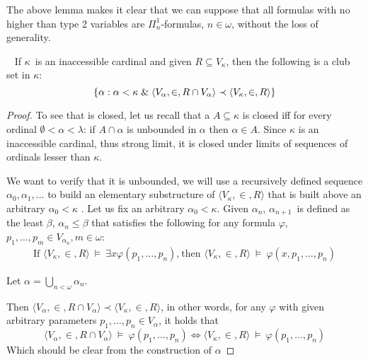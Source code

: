 The above lemma makes it clear that we can suppose that all formulas with no higher than type 2 variables are $\Pi^1_n$-formulas, $n \in \omega$, without the loss of generality.

\begin{lemma}\label{lemma:inaccessible_clubset}\ %
If $\kappa$ is an inaccessible cardinal and given $R \subseteq V_\kappa$, then the following is a club set in $\kappa$:
\begin{equation}
\{\alpha : \alpha < \kappa \mathrel{\&} \langle V_\alpha, \in, R \cap V_\alpha \rangle \prec \langle V_\kappa, \in, R \rangle \}\label{eq:inacc_lemma_set}
\end{equation}
\end{lemma}

\begin{proof}
To see that  is closed, let us recall that a $A \subseteq \kappa$ is closed iff for every ordinal $\emptyset < \alpha < \lambda$: if $A \cap \alpha$ is unbounded in $\alpha$ then $\alpha \in A$. Since $\kappa$ is an inaccessible cardinal, thus strong limit, it is closed under limits of sequences of ordinals lesser than $\kappa$.  


We want to verify that it is unbounded, we will use a recursively defined sequence $\alpha_0, \alpha_1, \ldots$
to build an elementary substructure of $\langle V_\kappa, \in, R \rangle$ that is built above an arbitrary $\alpha_0 <\kappa$ .
Let us fix an arbitrary $\alpha_0 < \kappa$. Given $\alpha_n$, $\alpha_{n+1}$ is defined as the least $\beta$, $\alpha_n \leq \beta$ that satisfies 
the following for any formula $\varphi$, $p_1, \ldots, p_m \in V_{\alpha_{n}}, m \in \omega$:
\begin{equation}
\begin{gathered}
\mbox{If }\langle V_\kappa, \in, R \rangle~\models~\exists x \varphi(p_1, \ldots, p_n)\mbox{,}\
\mbox{then }\langle V_\kappa, \in, R \rangle~\models~\varphi(x, p_1, \ldots, p_n)
\end{gathered}
\end{equation}

Let $\alpha = \bigcup_{n < \omega} \alpha_n$. 

Then $\langle V_\alpha, \in, R \cap V_\alpha \rangle \prec \langle V_\kappa, \in, R \rangle$, in other words, for any $\varphi$ with given arbitrary parameters $p_1, \ldots, p_n \in V_\alpha$, it holds that
\begin{equation}
\langle V_\alpha, \in, R \cap V_\alpha \rangle~\models~\varphi(p_1, \ldots, p_n) \iff \langle V_\kappa, \in, R \rangle~\models~\varphi(p_1, \ldots, p_n)
\end{equation}
Which should be clear from the construction of $\alpha$
\end{proof}

